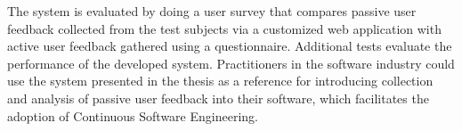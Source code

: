 The system is evaluated by doing a user survey that compares passive user feedback collected from the test subjects via a customized web application with active user feedback gathered using a questionnaire.
Additional tests evaluate the performance of the developed system.
Practitioners in the software industry could use the system presented in the thesis as a reference for introducing collection and analysis of passive user feedback into their software, which facilitates the adoption of Continuous Software Engineering.
